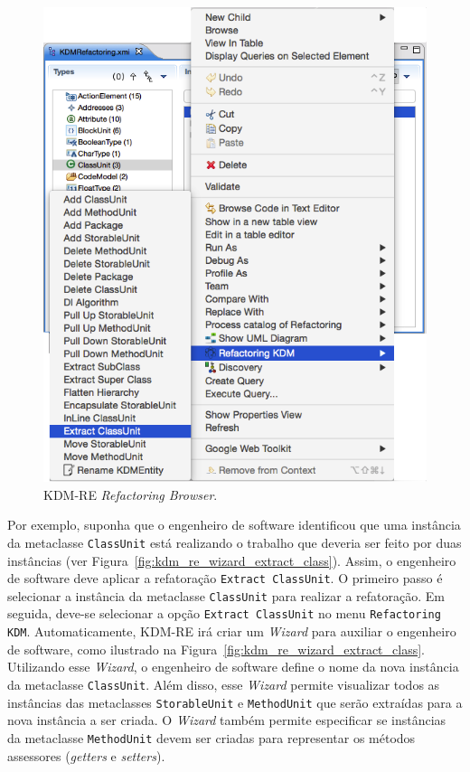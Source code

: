 \begin{figure}[h]
	\centering
	\caption{KDM-RE \textit{Refactoring Browser}.}
	\label{fig:kdm_re_refactoring_arvore}
	\includegraphics[scale=0.55]{images/novoMenuPopupKDM_RE}
	\fautor
\end{figure}


Por exemplo, suponha que o engenheiro de software identificou que uma instância da metaclasse \texttt{ClassUnit} está realizando o trabalho que deveria ser feito por duas instâncias (ver Figura~\ref{fig:kdm_re_wizard_extract_class}). Assim, o engenheiro de software deve aplicar a refatoração \texttt{Extract ClassUnit}. O primeiro passo é selecionar a instância da metaclasse \texttt{ClassUnit} para realizar a refatoração. Em seguida, deve-se selecionar a opção \texttt{Extract ClassUnit} no menu \texttt{Refactoring KDM}. Automaticamente, KDM-RE irá criar um \textit{Wizard} para auxiliar o engenheiro de software, como ilustrado na Figura~\ref{fig:kdm_re_wizard_extract_class}. Utilizando esse \textit{Wizard}, o engenheiro de software define o nome da nova instância da metaclasse \texttt{ClassUnit}. Além disso, esse \textit{Wizard} permite visualizar todos as instâncias das metaclasses \texttt{StorableUnit} e \texttt{MethodUnit} que serão extraídas para a nova instância a ser criada. O \textit{Wizard} também permite especificar se instâncias da metaclasse \texttt{MethodUnit} devem ser criadas para representar os métodos assessores (\textit{getters} e \textit{setters}). 

